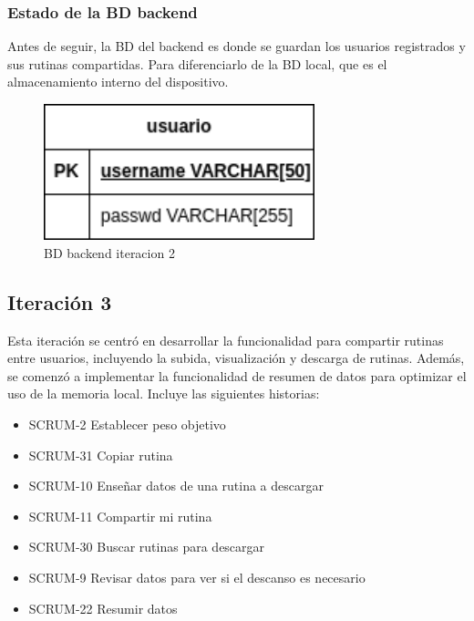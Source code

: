 \subsubsection{Estado de la BD backend} 

Antes de seguir, la BD del backend es donde se guardan los usuarios registrados y sus rutinas compartidas. Para diferenciarlo de la BD local, que es el almacenamiento interno del dispositivo.

\begin{figure}[H]
   \centering
    \includegraphics[width=0.7\textwidth]{fotos/BD be iteracion 2.png}
    \caption{BD backend iteracion 2}
    \label{fig:BD backend iteracion 2}
\end{figure}

\subsection{Iteración 3}
Esta iteración se centró en desarrollar la funcionalidad para compartir rutinas entre usuarios, incluyendo la subida, visualización y descarga de rutinas. Además, se comenzó a implementar la funcionalidad de resumen de datos para optimizar el uso de la memoria local. Incluye las siguientes historias:

\begin{itemize}
  \item SCRUM-2 Establecer peso objetivo
  \item SCRUM-31 Copiar rutina
  \item SCRUM-10 Enseñar datos de una rutina a descargar
  \item SCRUM-11 Compartir mi rutina
  \item SCRUM-30 Buscar rutinas para descargar
  \item SCRUM-9 Revisar datos para ver si el descanso es necesario
  \item SCRUM-22 Resumir datos
\end{itemize}


